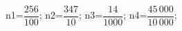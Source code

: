 \documentclass[exercice]{thedocument}%
\begin{document}
%
    \>n1=$\dfrac{256}{100}$;%
    \>n2=$\dfrac{347}{10}$;%
    \>n3=$\dfrac{14}{1000}$;%
    \>n4=$\dfrac{45\,000}{10\,000}$;%
\end{document}
